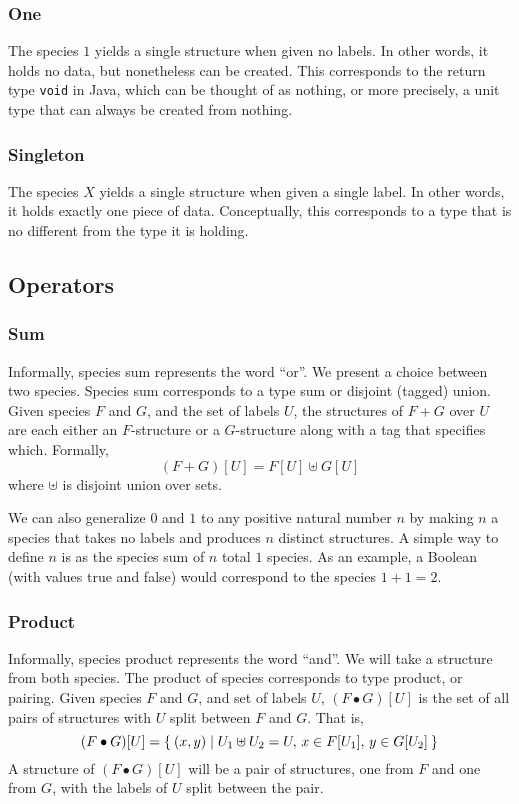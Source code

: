\documentclass{article}
\begin{document}
\subsubsection*{One}
The species \( 1 \) yields a single structure when given no labels. In other words, it holds no
data, but nonetheless can be created. This corresponds to the return type \verb|void| in Java, which
can be thought of as nothing, or more precisely, a unit type that can always be created from
nothing.

\subsubsection*{Singleton}
The species \( X \) yields a single structure when given a single label. In other words, it holds
exactly one piece of data. Conceptually, this corresponds to a type that is no different from the
type it is holding.

\subsection{Operators}
\subsubsection*{Sum}
Informally, species sum represents the word ``or''. We present a choice between two species.
Species sum corresponds to a type sum or disjoint (tagged) union. Given species \( F \) and \( G \),
and the set of labels \( U \), the structures of \( F + G \) over \( U \) are each either an \( F
\)-structure or a \( G \)-structure along with a tag that specifies which. Formally,
\[
  (F + G)[U] = F[U] \uplus G[U]
\]
where \( \uplus \) is disjoint union over sets.~\cite{yorgey}

We can also generalize \( 0 \) and \( 1 \) to any positive natural number \( n \) by making \( n \)
a species that takes no labels and produces \( n \) distinct structures. A simple way to define \( n
\) is as the species sum of \( n \) total \( 1 \) species. As an example, a Boolean (with values
true and false) would correspond to the species \( 1 + 1 = 2 \).

\subsubsection*{Product}
Informally, species product represents the word ``and''. We will take a structure from both species.
The product of species corresponds to type product, or pairing. Given species \( F \) and \( G \),
and set of labels \( U \), \( (F \bullet G)[U] \) is the set of all pairs of structures with \( U \)
split between \( F \) and \( G \). That is,
\[
  (F \bullet G)[U] = \Set{ (x, y) | U_1 \uplus U_2 = U,\, x \in F[U_1],\, y \in G[U_2] }
\]
A structure of \( (F \bullet G)[U] \) will be a pair of structures, one from \( F \) and one from \(
G \), with the labels of \( U \) split between the pair.
\end{document}
